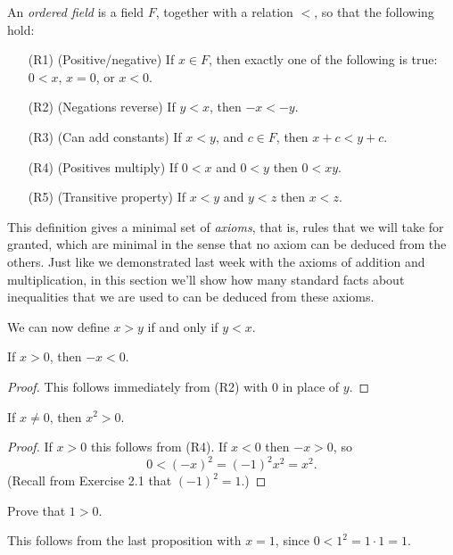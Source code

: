 \documentclass[11pt,dvipsnames]{book}
\numberwithin{equation}{section} %
\numberwithin{figure}{section} %
\numberwithin{table}{section} %
\begin{document}
\medskip
\begin{definition} An {\em ordered field} is a field $F$, together with a relation $<$, so that the following hold: %
\begin{enumerate}
\item[(R1)] (Positive/negative) If $x\in F$, then exactly one of the following is true: $0<x$, $x=0$, or $x<0$.
\item[(R2)] (Negations reverse) If $y<x$, then $-x<-y$.
\item[(R3)] (Can add constants) If $x<y$, and $c\in F$, then $x+c<y+c$.
\item[(R4)] (Positives multiply) If $0<x$ and $0<y$ then $0<xy$.
\item[(R5)] (Transitive property) If $x<y$ and $y<z$ then $x<z$.
\end{enumerate}
\end{definition}

This definition gives a minimal set of {\it axioms}, that is, rules that we will take for granted, which are minimal in the sense that no axiom can be deduced from the others. Just like we demonstrated last week with the axioms of addition and multiplication, in this section we'll show how many standard facts about inequalities that we are used to can be deduced from these axioms. %

We can now define \(x>y\) if and only if \(y<x\).

\begin{proposition}
If $x>0$, then $-x<0$. 
\end{proposition}

\begin{proof}
This follows immediately from (R2) with $0$ in place of $y$. 
\end{proof}

\begin{proposition}
If $x\neq 0$, then $x^2>0$. 
\end{proposition}

\begin{proof}
If $x>0$ this follows from (R4).  If $x<0$ then $-x>0$, so 
\[
0<(-x)^2= (-1)^2x^2=x^2. 
\]
(Recall from Exercise 2.1 that $(-1)^2=1$.)
\end{proof}

\begin{exercise}
Prove that $1>0$. 
\begin{solution}
This follows from the last proposition with $x=1$, since $0<1^2=1\cdot 1=1$. 
\end{solution}
\end{exercise}
\end{document}

